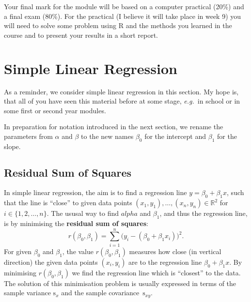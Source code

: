 \documentclass[
  a4paper,
]{article}
\theoremstyle{definition}
\theoremstyle{definition}
\theoremstyle{definition}
\theoremstyle{definition}
\theoremstyle{remark}
\begin{document}
Your final mark for the module will be based on a computer practical
(20\%) and a final exam (80\%). For the practical (I believe it will
take place in week 9) you will need to solve some problem using R and
the methods you learned in the course and to present your results in a
short report.

\clearpage

\hypertarget{S01-simple}{%
\section{Simple Linear Regression}\label{S01-simple}}

As a reminder, we consider simple linear regression in this section.
My hope is, that all of you have seen this material before at some
stage, \emph{e.g.}~in school or in some first or second year modules.

In preparation for notation introduced in the next section, we rename
the parameters from \(\alpha\) and \(\beta\) to the new names \(\beta_0\)
for the intercept and \(\beta_1\) for the slope.

\hypertarget{residual-sum-of-squares}{%
\subsection{Residual Sum of Squares}\label{residual-sum-of-squares}}

In simple linear regression, the aim is to find a regression line \(y = \beta_0 + \beta_1 x\), such that the line is ``close'' to given data points
\((x_1, y_1), \ldots, (x_n, y_n) \in\mathbb{R}^2\) for \(i \in \{1, 2, \ldots, n\}\). The ususal way to find \(alpha\) and \(\beta_1\), and thus the regression
line, is by minimising the \textbf{residual sum of squares}:
\begin{equation}
  r(\beta_0, \beta_1)
  = \sum_{i=1}^n \bigl( y_i - (\beta_0 + \beta_1 x_i) \bigr)^2.
  \label{eq:RSS}
\end{equation}
For given \(\beta_0\) and \(\beta_1\), the value \(r(\beta_0, \beta_1)\) measures
how close (in vertical direction) the given data points \((x_i, y_i)\)
are to the regression line \(\beta_0 + \beta_1 x\). By minimising
\(r(\beta_0, \beta_1)\) we find the regression line which is ``closest'' to
the data. The solution of this minimisation problem is usually
expressed in terms of the sample variance \(\mathrm{s}_x\) and the
sample covariance~\(\mathrm{s}_{xy}\).
\end{document}
